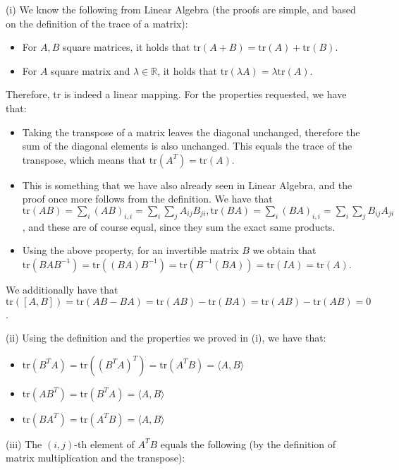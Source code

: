 \begin{solution}
    
    (i) We know the following from Linear Algebra (the proofs are simple, and based on the definition of the trace of a matrix):
    \begin{itemize}
        \item For $A, B$ square matrices, it holds that $\text{tr}(A+B) = \text{tr}(A) + \text{tr}(B)$.
        \item For $A$ square matrix and $\lambda \in \mathbb{R}$, it holds that $\text{tr}(\lambda A) = \lambda \text{tr}(A)$.
    \end{itemize}
    Therefore, tr is indeed a linear mapping. For the properties requested, we have that:
    \begin{itemize}
        \item Taking the transpose of a matrix leaves the diagonal unchanged, therefore the sum of the diagonal elements is also unchanged. This equals the trace of the transpose, which means that $\text{tr}(A^T) = \text{tr}(A)$.
        \item This is something that we have also already seen in Linear Algebra, and the proof once more follows from the definition. We have that $\text{tr}(AB) = \sum_i (AB)_{i,i} = \sum_i \sum_j A_{ij}B_{ji}, \text{tr}(BA) = \sum_i (BA)_{i, i} = \sum_i \sum_j B_{ij}A_{ji}$, and these are of course equal, since they sum the exact same products.
        \item Using the above property, for an invertible matrix $B$ we obtain that $\text{tr}(BAB^{-1}) = \text{tr}((BA)B^{-1}) = \text{tr}(B^{-1}(BA)) = \text{tr}(IA) = \text{tr}(A)$.
    \end{itemize}
    We additionally have that $\text{tr}([A, B]) = \text{tr}(AB - BA) = \text{tr}(AB) - \text{tr}(BA) = \text{tr}(AB) - \text{tr}(AB) = 0$.

    (ii) Using the definition and the properties we proved in (i), we have that:
    \begin{itemize}
        \item $\text{tr}(B^TA) = \text{tr}((B^TA)^T) = \text{tr}(A^TB) = \langle A, B \rangle$
        \item $\text{tr}(AB^T) = \text{tr}(B^TA) = \langle A, B \rangle$
        \item $\text{tr}(BA^T) = \text{tr}(A^TB) = \langle A, B \rangle$
    \end{itemize}

    (iii) The $(i, j)$-th element of $A^TB$ equals the following (by the definition of matrix multiplication and the transpose):
    

\end{solution}
